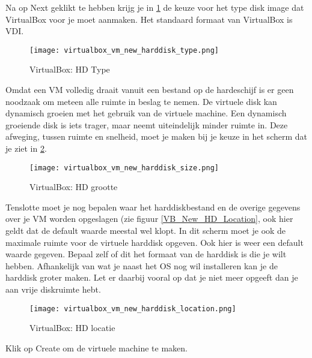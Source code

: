 Na op Next geklikt te hebben krijg je in \ref{VB_New_VM_HD_Type} de keuze voor het type disk image dat VirtualBox voor je moet aanmaken. Het standaard formaat van VirtualBox is VDI.

\begin{figure}[H]
	\centering
	\texttt{[image: virtualbox\_vm\_new\_harddisk\_type.png]}
	\caption{VirtualBox: HD Type}
	\label{VB_New_VM_HD_Type}
\end{figure}

Omdat een VM volledig draait vanuit een bestand op de hardeschijf is er geen noodzaak om meteen alle ruimte in beslag te nemen. De virtuele disk kan dynamisch groeien met het gebruik van de virtuele machine. Een dynamisch groeiende disk is iets trager, maar neemt uiteindelijk minder ruimte in. Deze afweging, tussen ruimte en snelheid, moet je maken bij je keuze in het scherm dat je ziet in \ref{VB_New_VM_HD_Size}.

\begin{figure}[H]
	\centering
	\texttt{[image: virtualbox\_vm\_new\_harddisk\_size.png]}
	\caption{VirtualBox: HD grootte}
	\label{VB_New_VM_HD_Size}
\end{figure}

Tenslotte moet je nog bepalen waar het harddiskbestand en de overige gegevens over je VM worden opgeslagen (zie figuur \ref{VB_New_HD_Location}, ook hier geldt dat de default waarde meestal wel klopt. In dit scherm moet je ook de maximale ruimte voor de virtuele harddisk opgeven. Ook hier is weer een default waarde gegeven. Bepaal zelf of dit het formaat van de harddisk is die je wilt hebben. Afhankelijk van wat je naast het OS nog wil installeren kan je de harddisk groter maken. Let er daarbij vooral op dat je niet meer opgeeft dan je aan vrije diskruimte hebt.

\begin{figure}[H]
	\centering
	\texttt{[image: virtualbox\_vm\_new\_harddisk\_location.png]}
	\caption{VirtualBox: HD locatie}
	\label{VB_New_VM_HD_Location}
\end{figure}

Klik op Create om de virtuele machine te maken.
